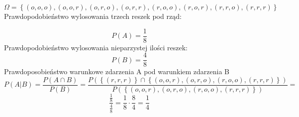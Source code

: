 \medskip
{} 
\medskip

\[ \Omega =\left \{(o,o,o),(o,o,r),(o,r,o),(o,r,r),(r,o,o),(r,o,r),(r,r,o),(r,r,r) \right \} \] 
Prawdopodobieństwo wylosowania trzech reszek pod rząd:

\[ P\left(A\right)= \frac{1}{8} \] 
Prawdopodobieństwo wylosowania nieparzystej ilości reszek:
\[ P\left(B\right)= \frac{4}{8} \] 
Prawdoposobieństwo warunkowe zdarzenia A pod warunkiem zdarzenia B
\[P\left(A|B\right) = \frac{P\left(A \cap B\right)}{P\left( B\right)} = \frac{ P \left(\left \{(r,r,r) \right \} \cap \left \{(o,o,r),(o,r,o),(r,o,o),(r,r,r) \right \}\right)}{ P \left( \left \{(o,o,r),(o,r,o),(r,o,o),(r,r,r) \right \}\right)} = \] 
\[  \frac{\frac{1}{8}}{\frac{4}{8}} = \frac{1}{8} \cdot \frac{8}{4} = \frac{1}{4} \] 
